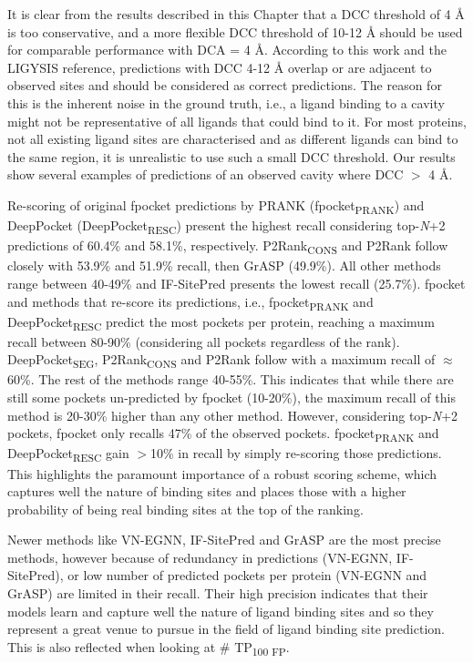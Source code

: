 It is clear from the results described in this Chapter that a DCC threshold of 4 \AA{} is too conservative, and a more flexible DCC threshold of 10-12 \AA{} should be used for comparable performance with DCA = 4 \AA{}. According to this work and the LIGYSIS reference, predictions with DCC 4-12 \AA{} overlap or are adjacent to observed sites and should be considered as correct predictions. The reason for this is the inherent noise in the ground truth, i.e., a ligand binding to a cavity might not be representative of all ligands that could bind to it. For most proteins, not all existing ligand sites are characterised and as different ligands can bind to the same region, it is unrealistic to use such a small DCC threshold. Our results show several examples of predictions of an observed cavity where DCC $>$ 4 \AA{}.

Re-scoring of original fpocket predictions by PRANK (fpocket\textsubscript{PRANK}) and DeepPocket (DeepPocket\textsubscript{RESC}) present the highest recall considering top-\textit{N}+2 predictions of 60.4\% and 58.1\%, respectively. P2Rank\textsubscript{CONS} and P2Rank follow closely with 53.9\% and 51.9\% recall, then GrASP (49.9\%). All other methods range between 40-49\% and IF-SitePred presents the lowest recall (25.7\%). fpocket and methods that re-score its predictions, i.e., fpocket\textsubscript{PRANK} and DeepPocket\textsubscript{RESC} predict the most pockets per protein, reaching a maximum recall between 80-90\% (considering all pockets regardless of the rank). DeepPocket\textsubscript{SEG}, P2Rank\textsubscript{CONS} and P2Rank follow with a maximum recall of $\approx$60\%. The rest of the methods range 40-55\%. This indicates that while there are still some pockets un-predicted by fpocket (10-20\%), the maximum recall of this method is 20-30\% higher than any other method. However, considering top-\textit{N}+2 pockets, fpocket only recalls 47\% of the observed pockets. fpocket\textsubscript{PRANK} and DeepPocket\textsubscript{RESC} gain $>$10\% in recall by simply re-scoring those predictions. This highlights the paramount importance of a robust scoring scheme, which captures well the nature of binding sites and places those with a higher probability of being real binding sites at the top of the ranking.

Newer methods like VN-EGNN, IF-SitePred and GrASP are the most precise methods, however because of redundancy in predictions (VN-EGNN, IF-SitePred), or low number of predicted pockets per protein (VN-EGNN and GrASP) are limited in their recall. Their high precision indicates that their models learn and capture well the nature of ligand binding sites and so they represent a great venue to pursue in the field of ligand binding site prediction. This is also reflected when looking at \# TP\textsubscript{100 FP}.

